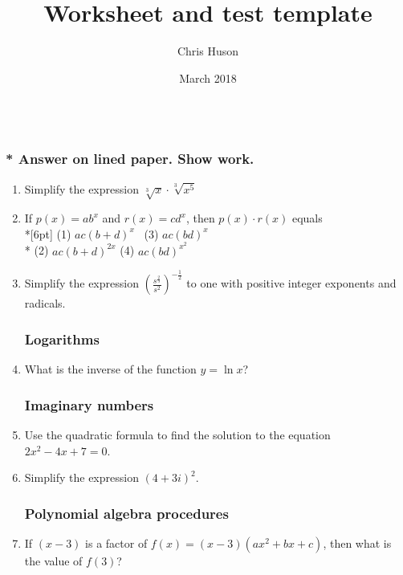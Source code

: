 \documentclass[12pt, oneside]{article}
\title{Worksheet and test template}
\author{Chris Huson}
\date{March 2018}
\begin{document}
\subsubsection*{\\* Answer on lined paper. Show work.}

\begin{enumerate}

\vspace{0.5 cm}

\subsubsection*{Rational exponents and radicals}

\item Simplify the expression $\sqrt[3]{x} \cdot \sqrt[3]{x^5}$

\item If $p(x)=ab^x$ and $r(x)=cd^x$, then $p(x) \cdot r(x)$ equals \\*[6pt]
(1) $ac(b+d)^x$ \, \qquad (3) $ac(bd)^x$\\*
(2) $ac(b+d)^{2x}$ \qquad (4) $ac(bd)^{x^2}$


\item Simplify the expression $\displaystyle \left( \frac{s^{\frac{2}{3}}}{s^2} \right)^{-\frac{1}{2}}$ to one with positive integer exponents and radicals.

\subsubsection*{Logarithms}
\item What is the inverse of the function $y=\ln x$?


\subsubsection*{Imaginary numbers}
\item Use the quadratic formula to find the solution to the equation $2x^2-4x+7=0$.
\item Simplify the expression $(4+3i)^2$.


\subsubsection*{Polynomial algebra procedures}

\item If $(x-3)$ is a factor of $f(x)=(x-3)(ax^2+bx+c)$, then what is the value of $f(3)$?


\end{enumerate}
\end{document}
